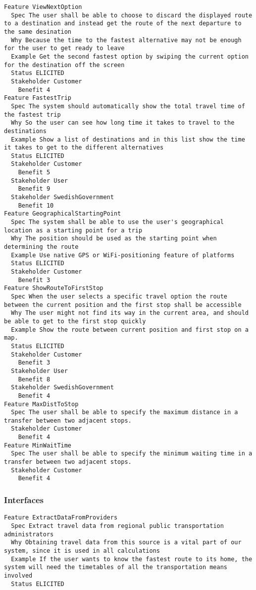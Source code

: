 \begin{lstlisting}
Feature ViewNextOption
  Spec The user shall be able to choose to discard the displayed route to a destination and instead get the route of the next departure to the same desination
  Why Because the time to the fastest alternative may not be enough for the user to get ready to leave
  Example Get the second fastest option by swiping the current option for the destination off the screen
  Status ELICITED
  Stakeholder Customer
    Benefit 4
Feature FastestTrip
  Spec The system should automatically show the total travel time of the fastest trip
  Why So the user can see how long time it takes to travel to the destinations
  Example Show a list of destinations and in this list show the time it takes to get to the different alternatives
  Status ELICITED
  Stakeholder Customer
    Benefit 5
  Stakeholder User
    Benefit 9
  Stakeholder SwedishGovernment
    Benefit 10
Feature GeographicalStartingPoint
  Spec The system shall be able to use the user's geographical location as a starting point for a trip
  Why The position should be used as the starting point when determining the route
  Example Use native GPS or WiFi-positioning feature of platforms
  Status ELICITED
  Stakeholder Customer
    Benefit 3
Feature ShowRouteToFirstStop
  Spec When the user selects a specific travel option the route between the current position and the first stop shall be accessible
  Why The user might not find its way in the current area, and should be able to get to the first stop quickly
  Example Show the route between current position and first stop on a map.
  Status ELICITED
  Stakeholder Customer
    Benefit 3
  Stakeholder User
    Benefit 8
  Stakeholder SwedishGovernment
    Benefit 4
Feature MaxDistToStop
  Spec The user shall be able to specify the maximum distance in a transfer between two adjacent stops.
  Stakeholder Customer
    Benefit 4
Feature MinWaitTime
  Spec The user shall be able to specify the minimum waiting time in a transfer between two adjacent stops.
  Stakeholder Customer
    Benefit 4

\end{lstlisting}
    
        
       \subsubsection{Interfaces}


\begin{lstlisting}
Feature ExtractDataFromProviders
  Spec Extract travel data from regional public transportation administrators
  Why Obtaining travel data from this source is a vital part of our system, since it is used in all calculations
  Example If the user wants to know the fastest route to its home, the system will need the timetables of all the transportation means involved
  Status ELICITED

\end{lstlisting}
    

